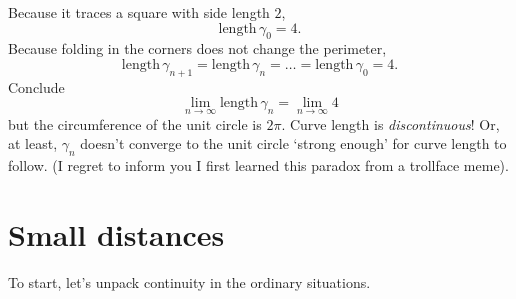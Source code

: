 \documentclass[a5paper]{scrbook}
\begin{document}
\begin{example}
  Because it traces a square with side length \(2\),
  \[
    \text{length}\,\gamma_0=4.
  \]
  Because folding in the corners does not change the perimeter,
  \[
    \text{length}\,\gamma_{n+1}=\text{length}\,\gamma_n  = \dots = \text{length}\,\gamma_0 = 4.
  \]
  Conclude
  \[
    \lim_{n\to \infty} \text{length}\, \gamma_n = \lim_{n\to\infty} 4
  \]
  but the circumference of the unit circle is \(2\pi\). Curve length is \emph{discontinuous}! Or, at least, \(\gamma_n\) doesn't converge to the unit circle `strong enough' for curve length to follow.  (I regret to inform you I first learned this paradox from a trollface meme).
\end{example}

\section{Small distances}
To start, let's unpack continuity in the ordinary situations. 
\end{document}

